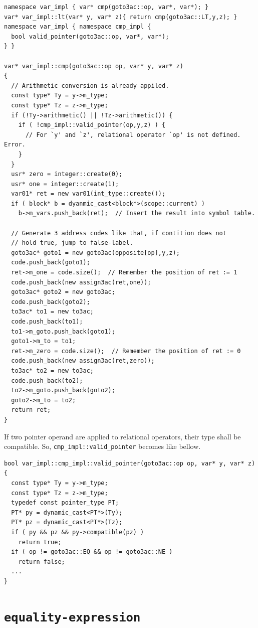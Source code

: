 \begin{verbatim}
namespace var_impl { var* cmp(goto3ac::op, var*, var*); }
var* var_impl::lt(var* y, var* z){ return cmp(goto3ac::LT,y,z); }
namespace var_impl { namespace cmp_impl {
  bool valid_pointer(goto3ac::op, var*, var*);
} }

var* var_impl::cmp(goto3ac::op op, var* y, var* z)
{
  // Arithmetic conversion is already appiled.
  const type* Ty = y->m_type;
  const type* Tz = z->m_type;
  if (!Ty->arithmetic() || !Tz->arithmetic()) {
    if ( !cmp_impl::valid_pointer(op,y,z) ) {
      // For `y' and `z', relational operator `op' is not defined. Error.
    }
  }
  usr* zero = integer::create(0);
  usr* one = integer::create(1);
  var01* ret = new var01(int_type::create());
  if ( block* b = dyanmic_cast<block*>(scope::current) )
    b->m_vars.push_back(ret);  // Insert the result into symbol table.

  // Generate 3 address codes like that, if contition does not
  // hold true, jump to false-label.
  goto3ac* goto1 = new goto3ac(opposite[op],y,z);
  code.push_back(goto1);
  ret->m_one = code.size();  // Remember the position of ret := 1
  code.push_back(new assign3ac(ret,one));
  goto3ac* goto2 = new goto3ac;
  code.push_back(goto2);
  to3ac* to1 = new to3ac;
  code.push_back(to1);
  to1->m_goto.push_back(goto1);
  goto1->m_to = to1;
  ret->m_zero = code.size();  // Remember the position of ret := 0
  code.push_back(new assign3ac(ret,zero));
  to3ac* to2 = new to3ac;
  code.push_back(to2);
  to2->m_goto.push_back(goto2);
  goto2->m_to = to2;
  return ret;
}
\end{verbatim}
If two pointer operand are applied to relational operators,
their type shall be compatible. So, {\tt{cmp\_impl::valid\_pointer}}
becomes like bellow.
\begin{verbatim}
bool var_impl::cmp_impl::valid_pointer(goto3ac::op op, var* y, var* z)
{
  const type* Ty = y->m_type;
  const type* Tz = z->m_type;
  typedef const pointer_type PT;
  PT* py = dynamic_cast<PT*>(Ty);
  PT* pz = dynamic_cast<PT*>(Tz);
  if ( py && pz && py->compatible(pz) )
    return true;
  if ( op != goto3ac::EQ && op != goto3ac::NE )
    return false;
  ...
}
\end{verbatim}

\section{\tt{equality-expression}}
\label{expr_e012}

